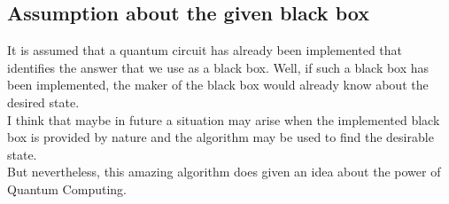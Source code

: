 \documentclass[13pt]{article}
\begin{document}
\subsection{Assumption about the given black box}
It is assumed that a quantum circuit has already been implemented that identifies the answer that we use as a black box. Well, if such a black box has been implemented, the maker of the black box would already know about the desired state.\\
I think that maybe in future a situation may arise when the implemented black box is provided by nature and the algorithm may be used to find the desirable state.\\
But nevertheless, this amazing algorithm does given an idea about the power of Quantum Computing.
\end{document}
